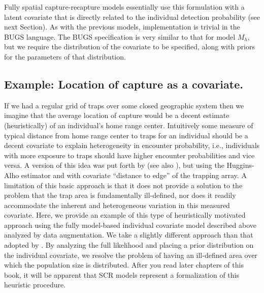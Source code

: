 Fully spatial capture-recapture models essentially use this
formulation with a latent covariate that is directly related to the
individual detection probability (see next Section). As with the
previous models, implementation is trivial in the BUGS language. The
BUGS specification is very similar to that for model $M_h$, but we
require the distribution of the covariate to be specified, along with
priors for the parameters of that distribution.


\subsection{Example: Location of capture as a covariate.}

If we had a regular grid of traps over some closed geographic system
then we imagine that the average location of capture would be a decent
estimate (heuristically) of an individual's home range center.
Intuitively some measure of typical distance from home range center to
traps for an individual should be a decent covariate to explain
heterogeneity in encounter probability, i.e., individuals with more
exposure to traps should have higher encounter probabilities and vice
versa.  A version of this idea was put forth by
\citet{boulanger_mclellan:2001} (see also \citet{ivan:2012}), but
using the Huggins-Alho estimator and with covariate ``distance to
edge'' of the trapping array. A limitation of this basic approach is
that it does not provide a solution to the problem that the trap area
is fundamentally ill-defined, nor does it readily accommodate the
inherent and heterogeneous variation in this measured covariate.
Here, we provide an example of this type of heuristically motivated
approach using the fully model-based individual covariate model
described above analyzed by data augmentation. We take a slightly
different approach than that adopted by
\citet{boulanger_mclellan:2001}. By analyzing the full likelihood and
placing a prior distribution on the individual covariate, we resolve
the problem of having an ill-defined area over which the population
size is distributed. After you read later chapters of this book, it
will be apparent that SCR models represent a formalization of this
heuristic procedure.

